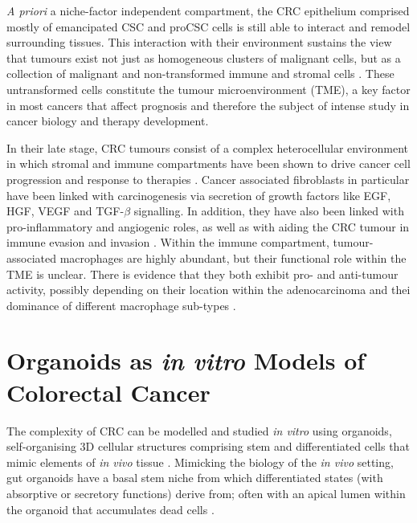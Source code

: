 \emph{A priori} a niche-factor independent compartment, the CRC epithelium comprised mostly of emancipated CSC and proCSC cells is still able to interact and remodel surrounding tissues. This interaction with their environment sustains the view that tumours exist not just as homogeneous clusters of malignant cells, but as a collection of malignant and non-transformed immune and stromal cells \cite{balkwill_tumor_2012}. These untransformed cells constitute the tumour microenvironment (TME), a key factor in most cancers that affect prognosis \cite{calon_stromal_2015} and therefore the subject of intense study in cancer biology and therapy development. 

In their late stage, CRC tumours consist of a complex heterocellular environment in which stromal and immune compartments have been shown to drive cancer cell progression \cite{peddareddigari_tumor_2010,isella_stromal_2015} and response to therapies \cite{tape_heterocellular_2017, toor_immune_2019}.
Cancer associated fibroblasts in particular have been linked with carcinogenesis via secretion of growth factors like EGF, HGF, VEGF and TGF-$\beta$ signalling. In addition, they have also been linked with pro-inflammatory and angiogenic roles, as well as with aiding the CRC tumour in immune evasion and invasion \cite{karagiannis_cancer-associated_2012}.
Within the immune compartment, tumour-associated macrophages are highly abundant, but their functional role within the TME is unclear. There is evidence that they both exhibit pro- and anti-tumour activity, possibly depending on their location within the adenocarcinoma and thei dominance of different macrophage sub-types \cite{martinez_m1_2014}. 


\section{Organoids as \textit{in vitro} Models of Colorectal Cancer}

The complexity of CRC can be modelled and studied \emph{in vitro} using organoids, self-organising 3D cellular structures comprising stem and differentiated cells that mimic elements of \emph{in vivo} tissue \cite{huch_modeling_2015,lancaster_disease_2019,almeqdadi_gut_2019}. Mimicking the biology of the \emph{in vivo} setting, gut organoids have a basal stem niche from which differentiated states (with absorptive or secretory functions) derive from; often with an apical lumen within the organoid that accumulates dead cells \cite{sato_single_2009}.

